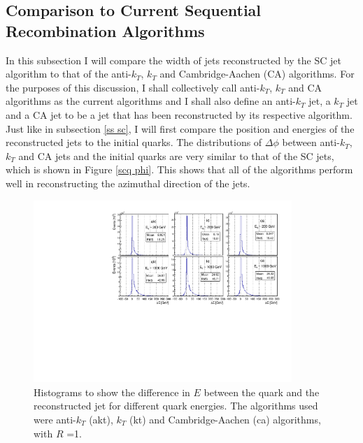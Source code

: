 \documentclass[a4paper,11pt, onecolumn]{article}
\begin{document}
 
 \subsection{Comparison to Current Sequential Recombination Algorithms} \label{ss others}

  In this subsection I will compare the width of jets reconstructed by the SC jet algorithm to that of the anti-$k_{T}$, $k_{T}$ 
  and Cambridge-Aachen (CA) algorithms. For the purposes of this discussion, I shall collectively call anti-$k_{T}$, $k_{T}$
  and CA algorithms as the current algorithms and I shall also define an anti-$k_T$ jet, a $k_T$ jet and a CA jet to be a jet
  that has been reconstructed by its respective algorithm. \\

  Just like in subsection \ref{ss sc}, I will first compare the position and energies
  of the reconstructed jets to the initial quarks. The distributions of $\Delta\phi$ between anti-$k_{T}$, $k_{T}$ and CA jets and the initial quarks
  are very similar to that of the SC jets, which is shown in Figure \ref{scq phi}. This shows that all of the algorithms perform well in reconstructing
  the azimuthal direction of the jets. \\
  
  \begin{figure}[!htb]
    \begin{center}
      \includegraphics[width = 0.87\textwidth]{jetq_E}
      \caption{Histograms to show the difference in $E$ between the quark and the reconstructed 
               jet for different quark energies. The algorithms used were anti-$k_{T}$ (akt), $k_{T}$ (kt) 
               and Cambridge-Aachen (ca) algorithms, with $R$ =1. \vspace{-0.5cm}}
      \label{jetq E}
    \end{center}

  \end{figure}
  
\end{document}
